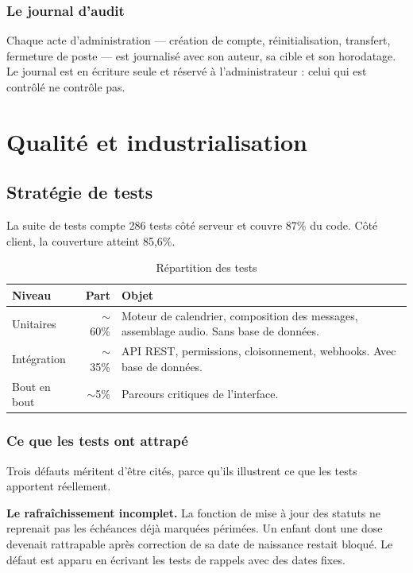 \documentclass[11pt,a4paper]{report}
\begin{document}
\subsection{Le journal d'audit}

Chaque acte d'administration — création de compte, réinitialisation,
transfert, fermeture de poste — est journalisé avec son auteur, sa cible et
son horodatage. Le journal est en écriture seule et réservé à
l'administrateur : celui qui est contrôlé ne contrôle pas.

\chapter{Qualité et industrialisation}

\section{Stratégie de tests}

La suite de tests compte 286 tests côté serveur et couvre 87\% du code. Côté
client, la couverture atteint 85,6\%.

\begin{table}[H]
\centering
\begin{tabularx}{\textwidth}{@{}lrX@{}}
\toprule
\textbf{Niveau} & \textbf{Part} & \textbf{Objet} \\
\midrule
Unitaires & $\sim$60\% & Moteur de calendrier, composition des messages,
assemblage audio. Sans base de données. \\
Intégration & $\sim$35\% & API REST, permissions, cloisonnement, webhooks.
Avec base de données. \\
Bout en bout & $\sim$5\% & Parcours critiques de l'interface. \\
\bottomrule
\end{tabularx}
\caption{Répartition des tests}
\end{table}

\subsection{Ce que les tests ont attrapé}

Trois défauts méritent d'être cités, parce qu'ils illustrent ce que les
tests apportent réellement.

\textbf{Le rafraîchissement incomplet.} La fonction de mise à jour des
statuts ne reprenait pas les échéances déjà marquées périmées. Un enfant dont
une dose devenait rattrapable après correction de sa date de naissance restait
bloqué. Le défaut est apparu en écrivant les tests de rappels avec des dates
fixes.
\end{document}
